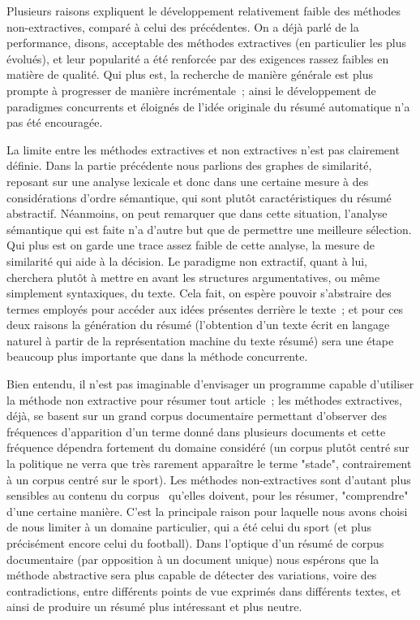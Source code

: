 \documentclass[a4paper, 12pt]{article}
\begin{document}
Plusieurs raisons expliquent le développement relativement faible des méthodes non-extractives, comparé à celui des précédentes. On a déjà parlé de la performance, disons, acceptable des méthodes extractives (en particulier les plus évolués), et leur popularité a été renforcée par des exigences rassez faibles en matière de qualité. Qui plus est, la recherche de manière générale est plus prompte à progresser de manière incrémentale~; ainsi le développement de paradigmes concurrents et éloignés de l'idée originale du résumé automatique n'a pas été encouragée.

La limite entre les méthodes extractives et non extractives n'est pas clairement définie. Dans la partie précédente nous parlions des graphes de similarité, reposant sur une analyse lexicale et donc dans une certaine mesure à des considérations d'ordre sémantique, qui sont plutôt caractéristiques du résumé abstractif. Néanmoins, on peut remarquer que dans cette situation, l'analyse sémantique qui est faite n'a d'autre but que de permettre une meilleure sélection. Qui plus est on garde une trace assez faible de cette analyse, la mesure de similarité qui aide à la décision. Le paradigme non extractif, quant à lui, cherchera plutôt à mettre en avant les structures argumentatives, ou même simplement syntaxiques, du texte. Cela fait, on espère pouvoir s'abstraire des termes employés pour accéder aux idées présentes derrière le texte~; et pour ces deux raisons la génération du résumé (l'obtention d'un texte écrit en langage naturel à partir de la représentation machine du texte résumé) sera une étape beaucoup plus importante que dans la méthode concurrente.

Bien entendu, il n'est pas imaginable d'envisager un programme capable d'utiliser la méthode non extractive pour résumer tout article~; les méthodes extractives, déjà, se basent sur un grand corpus documentaire permettant d'observer des fréquences d'apparition d'un terme donné dans plusieurs documents et cette fréquence dépendra fortement du domaine considéré (un corpus plutôt centré sur la politique ne verra que très rarement apparaître le terme "stade", contrairement à un corpus centré sur le sport). Les méthodes non-extractives sont d'autant plus sensibles au contenu du corpus~\cite[p.1774]{jones_automatic_2007} qu'elles doivent, pour les résumer, "comprendre" d'une certaine manière. C'est la principale raison pour laquelle nous avons choisi de nous limiter à un domaine particulier, qui a été celui du sport (et plus précisément encore celui du football). Dans l'optique d'un résumé de corpus documentaire (par opposition à un document unique) nous espérons que la méthode abstractive sera plus capable de détecter des variations, voire des contradictions, entre différents points de vue exprimés dans différents textes, et ainsi de produire un résumé plus intéressant et plus neutre.
\end{document}
